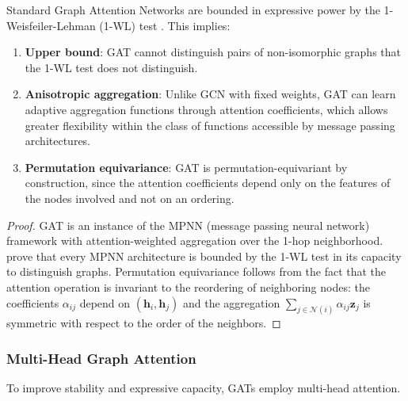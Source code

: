 \begin{proposition}\label{prop:gat_expressive_power}
Standard Graph Attention Networks are bounded in expressive power by the 1-Weisfeiler-Lehman (1-WL) test \citep{xu2019how}. This implies:
\begin{enumerate}
    \item \textbf{Upper bound}: GAT cannot distinguish pairs of non-isomorphic graphs that the 1-WL test does not distinguish.
    \item \textbf{Anisotropic aggregation}: Unlike \gls{GCN} with fixed weights, GAT can learn adaptive aggregation functions through attention coefficients, which allows greater flexibility within the class of functions accessible by message passing architectures.
    \item \textbf{Permutation equivariance}: GAT is permutation-equivariant by construction, since the attention coefficients depend only on the features of the nodes involved and not on an ordering.
\end{enumerate}
\end{proposition}

\begin{proof}
GAT is an instance of the MPNN (message passing neural network) framework with attention-weighted aggregation over the 1-hop neighborhood. \citet{xu2019how} prove that every MPNN architecture is bounded by the 1-WL test in its capacity to distinguish graphs. Permutation equivariance follows from the fact that the attention operation is invariant to the reordering of neighboring nodes: the coefficients $\alpha_{ij}$ depend on $(\mathbf{h}_i, \mathbf{h}_j)$ and the aggregation $\sum_{j \in \mathcal{N}(i)} \alpha_{ij} \mathbf{z}_j$ is symmetric with respect to the order of the neighbors.
\end{proof}

\subsubsection{Multi-Head Graph Attention}\label{subsubsec:multihead_graph_attention}

To improve stability and expressive capacity, \glspl{GAT} employ multi-head attention.

